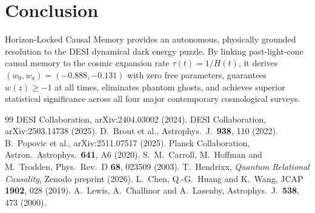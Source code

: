 \documentclass[10pt,twocolumn]{article}
\begin{document}
\section{Conclusion}
Horizon-Locked Causal Memory provides an autonomous, physically grounded resolution to the DESI dynamical dark energy puzzle. By linking past-light-cone causal memory to the cosmic expansion rate $\tau(t) = 1/H(t)$, it derives $(w_0, w_a) = (-0.888, -0.131)$ with zero free parameters, guarantees $w(z) \ge -1$ at all times, eliminates phantom ghosts, and achieves superior statistical significance across all four major contemporary cosmological surveys.

\begin{thebibliography}{99}\footnotesize\setlength{\itemsep}{0pt}
 DESI Collaboration, arXiv:2404.03002 (2024).
 DESI Collaboration, arXiv:2503.14738 (2025).
 D.~Brout et al., Astrophys.\ J.\ \textbf{938}, 110 (2022).
 B.~Popovic et al., arXiv:2511.07517 (2025).
 Planck Collaboration, Astron.\ Astrophys.\ \textbf{641}, A6 (2020).
 S.~M.~Carroll, M.~Hoffman and M.~Trodden, Phys.\ Rev.\ D \textbf{68}, 023509 (2003).
 T.~Hendrixx, \emph{Quantum Relational Causality}, Zenodo preprint (2026).
 L.~Chen, Q.-G.~Huang and K.~Wang, JCAP \textbf{1902}, 028 (2019).
 A.~Lewis, A.~Challinor and A.~Lasenby, Astrophys.\ J.\ \textbf{538}, 473 (2000).
\end{thebibliography}
\end{document}
